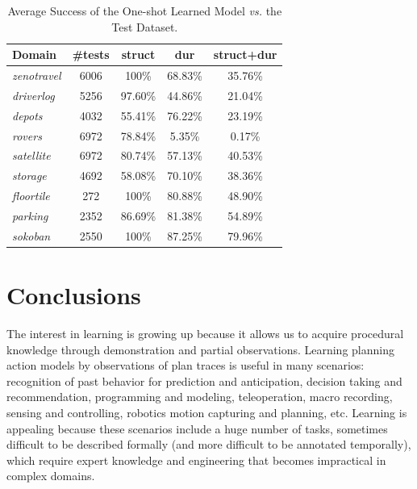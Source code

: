 \documentclass[10pt,journal,compsoc]{IEEEtran}
\begin{document}
\begin{table}
	\caption{Average Success of the One-shot Learned Model \emph{vs.} the Test Dataset.}
	\label{table:evaluationExperiments}
	\begin{center}
		\small
		\begin{tabular}{p{1.3cm}cccc}
			Domain & \#tests & struct & dur & struct+dur  \\
			
			\hline
			
			\emph{zenotravel} & 6006 & 100\% & 68.83\% & 35.76\% \\
			\emph{driverlog} & 5256 & 97.60\% & 44.86\% & 21.04\% \\
			\emph{depots} & 4032 & 55.41\% & 76.22\% & 23.19\% \\
			\emph{rovers} & 6972 & 78.84\% & 5.35\% & 0.17\% \\
			\emph{satellite} & 6972 & 80.74\% & 57.13\% & 40.53\% \\
			\emph{storage} & 4692 & 58.08\% & 70.10\% & 38.36\% \\
			\emph{floortile} & 272 & 100\% & 80.88\% & 48.90\%\\			
			\emph{parking} & 2352 & 86.69\% & 81.38\% & 54.89\% \\
			\emph{sokoban} & 2550 & 100\% & 87.25\% & 79.96\% \\
			
			\hline
		\end{tabular}
		\normalsize
	\end{center}
\end{table}







\section{Conclusions}
\label{sec:conclusions}


The interest in learning is growing up because it allows us to acquire procedural knowledge through demonstration and partial observations.
Learning planning action models by observations of plan traces is useful in many scenarios: recognition of past behavior for prediction and anticipation, decision taking and recommendation, programming and modeling, teleoperation, macro recording, sensing and controlling, robotics motion capturing and planning, etc. %
Learning is appealing because these scenarios include a huge number of tasks, sometimes difficult to be described formally (and more difficult to be annotated temporally), which require expert knowledge and engineering that becomes impractical in complex domains.
\end{document}
